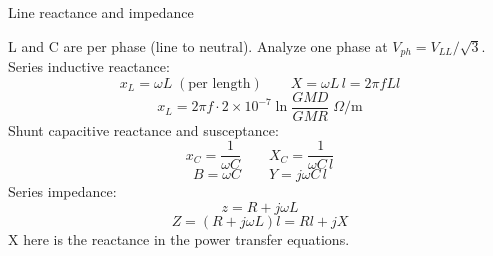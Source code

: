 Line reactance and impedance

L and C are per phase (line to neutral). Analyze one phase at $V_{ph}=V_{LL}/\sqrt{3}$.
Series inductive reactance:
$$x_L=\omega L\;(\text{per length})\qquad X=\omega L\,l=2\pi fLl$$
$$x_L=2\pi f\cdot2\times10^{-7}\ln\frac{GMD}{GMR}\;\Omega/\text{m}$$
Shunt capacitive reactance and susceptance:
$$x_C=\frac{1}{\omega C}\qquad X_C=\frac{1}{\omega C\,l}$$
$$B=\omega C\qquad Y=j\omega C\,l$$
Series impedance:
$$z=R+j\omega L$$
$$Z=\left(R+j\omega L\right)l=Rl+jX$$
X here is the reactance in the power transfer equations.
